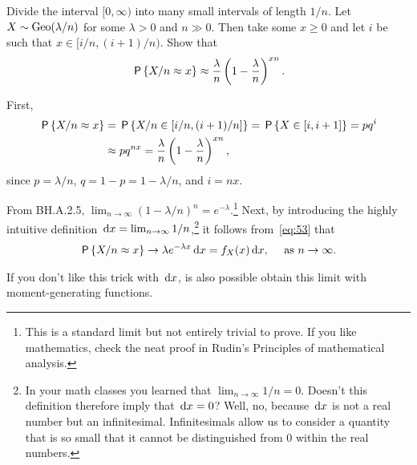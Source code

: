 \documentclass[a4paper,11pt]{article}
\begin{document}
\begin{exercise}\label{ex:7}
Divide the interval $[0, \infty)$ into many small intervals of length $1/n$.
Let  $X\sim \Geo{\lambda/n}$ for some $\lambda>0$ and $n\gg 0$. Then take  some $x\geq 0$ and  let $i$ be such that $x\in[i/n, (i+1)/n)$.
Show that
\begin{align}\label{eq:53}
\P{X/n \approx x} \approx \frac{\lambda} n \left(1-\frac \lambda n\right)^{xn}.
\end{align}
\begin{solution}
First,
\begin{align}
\P{X/n \approx x} &= \P{X/n \in [i/n, (i+1)/n]} = \P{X \in [i, i+1]} = p q^{i} \\
&\approx p q^{n x} = \frac{\lambda} n \left(1-\frac \lambda n\right)^{xn},
\end{align}
since $p=\lambda/n$, $q=1-p=1-\lambda/n$, and $i=nx$.
\end{solution}
\end{exercise}
From BH.A.2.5, $\lim_{n\to\infty}(1-\lambda/n)^{n} = e^{-\lambda}$.\footnote{This is a standard limit but not entirely trivial to prove. If you like mathematics, check the neat proof in Rudin's Principles of mathematical analysis.}
Next, by introducing the highly intuitive definition $\d x = \lim_{n\to \infty} 1/n$,\footnote{In your math classes you learned that $\lim_{n\to \infty} 1/n = 0$. Doesn't this definition therefore imply that $\d x = 0$? Well, no, because $\d x$ is not a real number but an infinitesimal. Infinitesimals allow us to consider a quantity that is so small that it cannot be distinguished from 0 within the real numbers.}  it follows from~\cref{eq:53} that
\begin{align}
\P{X/n \approx x} \to \lambda e^{-\lambda x} \d x = f_{X}(x) \d x,\quad\text{ as } n \to \infty.
\end{align}

If you don't like this trick with $\d x$, is also possible obtain this limit with moment-generating functions.
\end{document}
